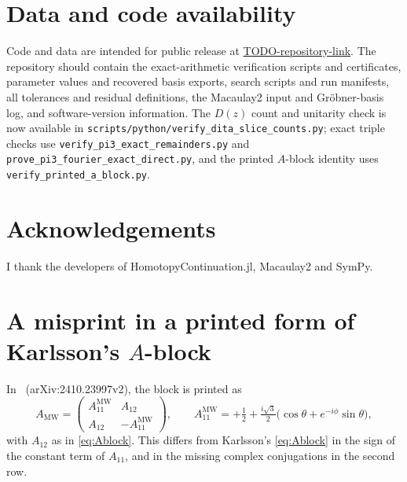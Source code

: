\documentclass[11pt]{article}
\numberwithin{equation}{section}
\theoremstyle{plain}
\theoremstyle{definition}
\theoremstyle{remark}
\begin{document}
\section*{Data and code availability}
Code and data are intended for public release at \url{TODO-repository-link}. The repository should contain the exact-arithmetic verification scripts and certificates, parameter values and recovered basis exports, search scripts and run manifests, all tolerances and residual definitions, the Macaulay2 input and Gr\"obner-basis log, and software-version information. The $D(z)$ count and unitarity check is now available in \texttt{scripts/python/verify\_dita\_slice\_counts.py}; exact triple checks use \texttt{verify\_pi3\_exact\_remainders.py} and \texttt{prove\_pi3\_fourier\_exact\_direct.py}, and the printed $A$-block identity uses \texttt{verify\_printed\_a\_block.py}.

\section*{Acknowledgements}
I thank the developers of HomotopyContinuation.jl, Macaulay2 and SymPy.

\appendix

\section{A misprint in a printed form of Karlsson's \texorpdfstring{$A$}{A}-block}\label{app:erratum}

In~\cite[Eqs.~(7.3)--(7.5)]{McNultyWeigert2026} (arXiv:2410.23997v2), the block is printed as
\[
A_{\mathrm{MW}}=\begin{pmatrix}A^{\mathrm{MW}}_{11}&A_{12}\\A_{12}&-A^{\mathrm{MW}}_{11}\end{pmatrix},\qquad
A^{\mathrm{MW}}_{11}=+\tfrac12+\tfrac{i\sqrt3}{2}\bigl(\cos\theta+e^{-i\phi}\sin\theta\bigr),
\]
with $A_{12}$ as in \eqref{eq:Ablock}. This differs from Karlsson's \eqref{eq:Ablock} in the sign of the constant term of $A_{11}$, and in the missing complex conjugations in the second row.
\end{document}
